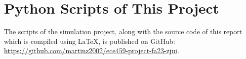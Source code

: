 \documentclass[../../ECE459FinalProjectReport.tex]{subfiles}
\begin{document}
\chapter{Python Scripts of This Project}
The scripts of the simulation project, along with the source code of this report which is compiled using \LaTeX, is published on GitHub: \url{https://github.com/martinz2002/ece459-project-fa23-zjui}.
\end{document}
